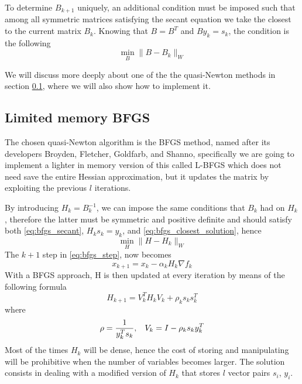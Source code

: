 \noindent To determine $B_{k+1}$ uniquely, an additional condition must be imposed such that among all symmetric matrices satisfying the secant equation we take the closest to the current matrix $B_k$. Knowing that $B=B^T$ and $By_k=s_k$, the condition is the following \footnotemark
\begin{equation}
    \displaystyle  \min_B \lVert B - B_k \rVert_W
    \label{eq:bfgs_closest_solution}
\end{equation}

\noindent We will discuss more deeply about one of the the quasi-Newton methods in section \ref{subsec:lbfgs}, where we will also show how to implement it.

\subsection{Limited memory BFGS}\label{subsec:lbfgs}
The chosen quasi-Newton algorithm is the BFGS method, named after its developers Broyden, Fletcher, Goldfarb, and Shanno, specifically we are going to implement a lighter in memory version of this called L-BFGS \cite{liu1989limited} which does not need save the entire Hessian approximation, but it updates the matrix by exploiting the previous $l$ iterations.
\vspace{3mm}

\noindent By introducing $H_k=B_k^{-1}$, we can impose the same conditions that $B_k$ had on $H_k$, therefore the latter must be symmetric and positive definite and should satisfy both \eqref{eq:bfgs_secant}, $H_ks_k=y_k$, and
\eqref{eq:bfgs_closest_solution}, hence
\begin{equation}
    \displaystyle  \min_H \lVert H - H_k \rVert_W
    \label{eq:bfgs_closest_solution_H}
\end{equation}
The $k+1$ step in \eqref{eq:bfgs_step}, now becomes
\begin{equation}
    x_{k+1} = x_k - \alpha_k H_k \nabla f_k
    \label{eq:bfgs_step_H}
\end{equation}
With a BFGS approach, H is then updated at every iteration by means of the following formula
\begin{equation}
    H_{k+1}=V_k^TH_kV_k+\rho_ks_ks_k^T
    \label{eq:bfgs_update_H}
\end{equation}
where
\begin{equation}
   \rho=\frac{1}{y_k^Ts_k}, \hspace{3mm} V_k=I-\rho_{k}s_{k}y_{k}^{T}
\end{equation}
\noindent Most of the times $H_k$ will be dense, hence the cost of storing and manipulating will be prohibitive when the number of variables becomes larger. The solution consists in dealing with a modified version of $H_k$ that stores $l$ vector pairs {$s_i$, $y_i$}.
\vspace{3mm}

